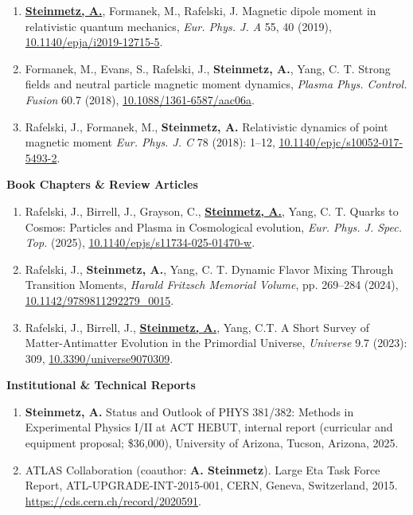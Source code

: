 \documentclass[11pt]{article}
\begin{document}
\begin{enumerate}[leftmargin=*,nosep]
    \item \textbf{\href{https://github.com/ajsteinmetz/magnetic-dipole-moment}{Steinmetz, A.}}, Formanek, M., Rafelski, J. Magnetic dipole moment in relativistic quantum mechanics, \textit{Eur. Phys. J. A} 55, 40 (2019), \href{https://doi.org/10.1140/epja/i2019-12715-5}{10.1140/epja/i2019-12715-5}.
    \item Formanek, M., Evans, S., Rafelski, J., \textbf{Steinmetz, A.}, Yang, C. T. Strong fields and neutral particle magnetic moment dynamics, \textit{Plasma Phys. Control. Fusion} 60.7 (2018), \href{https://doi.org/10.1088/1361-6587/aac06a}{10.1088/1361-6587/aac06a}.
    \item Rafelski, J., Formanek, M., \textbf{Steinmetz, A.} Relativistic dynamics of point magnetic moment \textit{Eur. Phys. J. C} 78 (2018): 1--12, \href{https://doi.org/10.1140/epjc/s10052-017-5493-2}{10.1140/epjc/s10052-017-5493-2}.
\end{enumerate}

\medskip

{\large\textbf{Book Chapters \& Review Articles}}

\begin{enumerate}[leftmargin=*,nosep]
    \item Rafelski, J., Birrell, J., Grayson, C., \textbf{\href{https://github.com/ajsteinmetz/thesis-collab-project}{Steinmetz, A.}}, Yang, C. T. Quarks to Cosmos: Particles and Plasma in Cosmological evolution, \textit{Eur. Phys. J. Spec. Top.} (2025), \href{https://doi.org/10.1140/epjs/s11734-025-01470-w}{10.1140/epjs/s11734-025-01470-w}.
    \item Rafelski, J., \textbf{Steinmetz, A.}, Yang, C. T. Dynamic Flavor Mixing Through Transition Moments, \textit{Harald Fritzsch Memorial Volume}, pp. 269--284 (2024), \href{https://doi.org/10.1142/9789811292279_0015}{10.1142/9789811292279\_0015}.
    \item Rafelski, J., Birrell, J., \textbf{\href{https://github.com/ajsteinmetz/a-short-survey}{Steinmetz, A.}}, Yang, C.T. A Short Survey of Matter-Antimatter Evolution in the Primordial Universe, \textit{Universe} 9.7 (2023): 309, \href{https://doi.org/10.3390/universe9070309}{10.3390/universe9070309}.
\end{enumerate}

\medskip

{\large\textbf{Institutional \& Technical Reports}}

\begin{enumerate}[leftmargin=*,nosep]
    \item \textbf{Steinmetz, A.} Status and Outlook of PHYS 381/382: Methods in Experimental Physics I/II at ACT HEBUT, internal report (curricular and equipment proposal; \$36,000), University of Arizona, Tucson, Arizona, 2025.
    \item ATLAS Collaboration (coauthor: \textbf{A. Steinmetz}). Large Eta Task Force Report, ATL-UPGRADE-INT-2015-001, CERN, Geneva, Switzerland, 2015. \href{https://cds.cern.ch/record/2020591}{https://cds.cern.ch/record/2020591}.
\end{enumerate}
\end{document}
